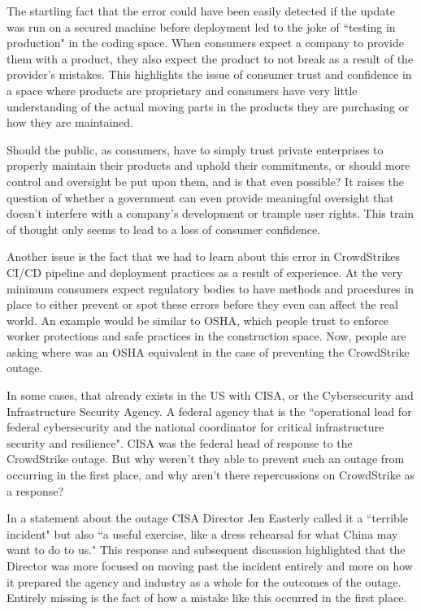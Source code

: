 The startling fact that the error could have been easily detected if the update was run on a secured machine before deployment led to the joke of ``testing in production" in the coding space. When consumers expect a company to provide them with a product, they also expect the product to not break as a result of the provider's mistakes. This highlights the issue of consumer trust and confidence in a space where products are proprietary and consumers have very little understanding of the actual moving parts in the products they are purchasing or how they are maintained.

Should the public, as consumers, have to simply trust private enterprises to properly maintain their products and uphold their commitments, or should more control and oversight be put upon them, and is that even possible? It raises the question of whether a government can even provide meaningful oversight that doesn't interfere with a company's development or trample user rights. This train of thought only seems to lead to a loss of consumer confidence.

Another issue is the fact that we had to learn about this error in CrowdStrikes CI/CD pipeline and deployment practices as a result of experience. At the very minimum consumers expect regulatory bodies to have methods and procedures in place to either prevent or spot these errors before they even can affect the real world. An example would be similar to OSHA, which people trust to enforce worker protections and safe practices in the construction space. Now, people are asking where was an OSHA equivalent in the case of preventing the CrowdStrike outage.

In some cases, that already exists in the US with CISA, or the Cybersecurity and Infrastructure Security Agency. A federal agency that is the ``operational lead for federal cybersecurity and the national coordinator for critical infrastructure security and resilience". CISA was the federal head of response to the CrowdStrike outage. But why weren't they able to prevent such an outage from occurring in the first place, and why aren't there repercussions on CrowdStrike as a response?

In a statement about the outage CISA Director Jen Easterly called it a ``terrible incident" but also ``a useful exercise, like a dress rehearsal for what China may want to do to us." This response and subsequent discussion highlighted that the Director was more focused on moving past the incident entirely and more on how it prepared the agency and industry as a whole for the outcomes of the outage. Entirely missing is the fact of how a mistake like this occurred in the first place.

